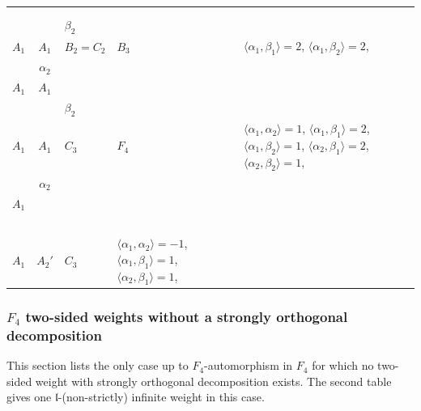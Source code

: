 \documentclass[12pt]{report}
\newcommand{\lL}{\mathfrak{l}}
\def\sperp{{\hbox{$\perp${\hbox{\kern -.77em $-$}\raise-1pt\hbox{\kern -.77em $-$}}\ }}}
\begin{document}
\begin{appendix}
{\begin{longtable}{rcl p{1cm}p{1cm}p{3cm} }
\\
\begin{tabular}{c}2$\alpha_1$\\\tiny{  }\end{tabular} &\begin{tabular}{c} = \\~ \end{tabular} & \begin{tabular}{cc}$\beta_1$+ & $\beta_2$\\\tiny{ $A_1$ } & \tiny{ $A_1$ }\end{tabular} & $B_2=C_2$ & $B_3$ &  $\langle\alpha_1, \beta_1\rangle=2$, $\langle\alpha_1, \beta_2\rangle=2$, 
\\
\begin{tabular}{cc}$\alpha_1$+ & $\alpha_2$\\\tiny{ $A_1$ } & \tiny{ $A_1$ }\end{tabular} &\begin{tabular}{c} = \\~ \end{tabular} & \begin{tabular}{cc}$\beta_1$+ & $\beta_2$\\\tiny{ $A_1$ } & \tiny{ $A_1$ }\end{tabular} & $C_3$ & $F_4$ & $\langle\alpha_1, \alpha_2\rangle=1$,  $\langle\alpha_1, \beta_1\rangle=2$, $\langle\alpha_1, \beta_2\rangle=1$, $\langle\alpha_2, \beta_1\rangle=2$, $\langle\alpha_2, \beta_2\rangle=1$, 
\\
\begin{tabular}{cc}$\alpha_1$+ & $\alpha_2$\\\tiny{ $A_1$ } & \tiny{  }\end{tabular} &\begin{tabular}{c} = \\~ \end{tabular} & \begin{tabular}{c}$\beta_1$\\\tiny{ $A_1$ }\end{tabular} & $A_2'$ & $C_3$ & $\langle\alpha_1, \alpha_2\rangle=-1$,  $\langle\alpha_1, \beta_1\rangle=1$, $\langle\alpha_2, \beta_1\rangle=1$, 
\\
\end{longtable}

\newpage
\subsubsection[$F_4$ two-sided weights without $\sperp$ decomposition]{$F_4$ two-sided weights without a strongly orthogonal decomposition}
This section lists the only case up to $F_4$-automorphism in $F_4$ for which no two-sided weight with strongly orthogonal decomposition exists. The second table gives one $\lL$-(non-strictly) infinite weight in this case.

}
\end{appendix}
\end{document}
